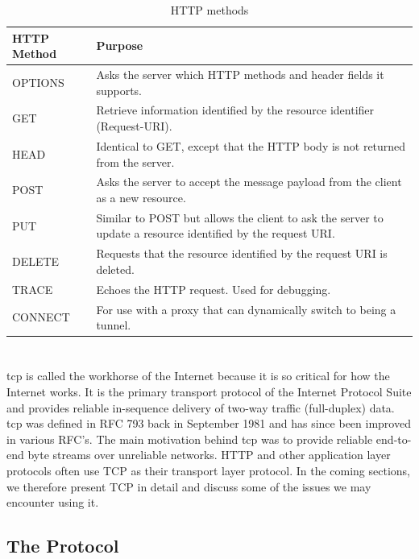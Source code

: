  \begin{table}[h]
 \begin{tabularx}{\textwidth}{| X | X |}
 \hline
   \textbf{HTTP Method} & \textbf{Purpose} \\ \hline
   OPTIONS & Asks the server which HTTP methods and header fields it supports. \\ \hline
   GET & Retrieve information identified by the resource identifier (Request-URI). \\ \hline
   HEAD & Identical to GET, except that the HTTP body is not returned from the server. \\ \hline
   POST & Asks the server to accept the message payload from the client as a new resource.\\ \hline
   PUT & Similar to POST but allows the client to ask the server to update a resource identified by the request URI. \\ \hline
   DELETE & Requests that the resource identified by the request URI is deleted. \\ \hline
   TRACE & Echoes the HTTP request. Used for debugging. \\ \hline
   CONNECT & For use with a proxy that can dynamically switch to being a tunnel.\\ \hline
 \end{tabularx}
 \caption{HTTP methods}
 \label{table-http-methods}
 \end{table}

\section{}
\label{tcp}

\gls{tcp} is called the workhorse of the Internet because it is so critical for
how the Internet works. It is the primary transport protocol of the Internet
Protocol Suite\cite{rfc-1122} and provides reliable in-sequence delivery of
two-way traffic (full-duplex) data. \gls{tcp} was defined in RFC
793\cite{rfc-793} back in September 1981 and has since been improved in various
RFC's. The main motivation behind \gls{tcp} was to provide reliable end-to-end
byte streams over unreliable networks. HTTP and other application layer
protocols often use TCP as their transport layer protocol. In the coming
sections, we therefore present TCP in detail and discuss some of the issues we
may encounter using it.

 \subsection{The Protocol}


